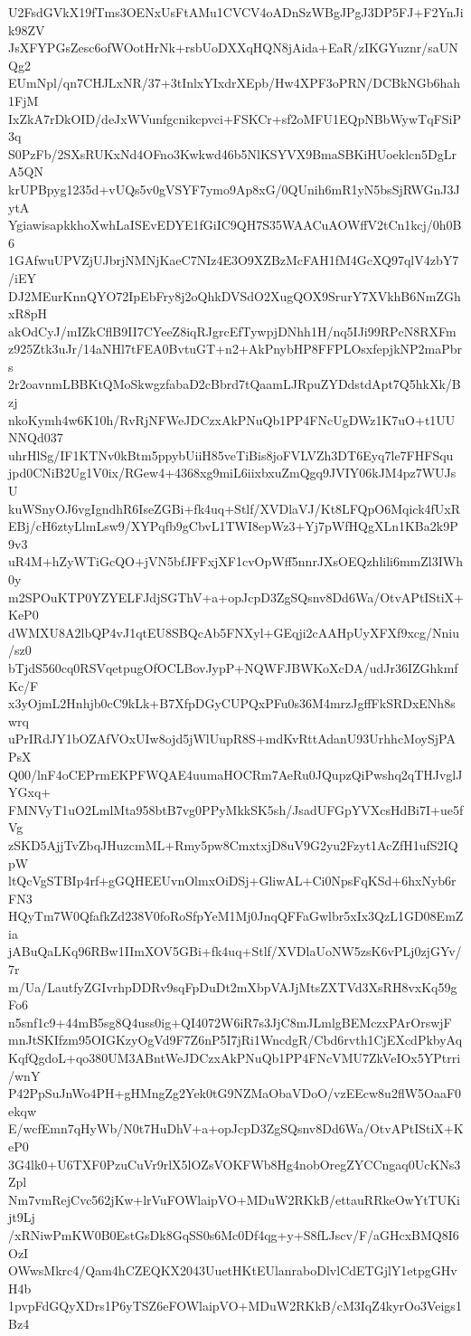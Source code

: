 U2FsdGVkX19fTms3OENxUsFtAMu1CVCV4oADnSzWBgJPgJ3DP5FJ+F2YnJik98ZV
JsXFYPGsZesc6ofWOotHrNk+rsbUoDXXqHQN8jAida+EaR/zIKGYuznr/saUNQg2
EUmNpl/qn7CHJLxNR/37+3tInlxYIxdrXEpb/Hw4XPF3oPRN/DCBkNGb6hah1FjM
IxZkA7rDkOID/deJxWVunfgcnikcpvci+FSKCr+sf2oMFU1EQpNBbWywTqFSiP3q
S0PzFb/2SXsRUKxNd4OFno3Kwkwd46b5NlKSYVX9BmaSBKiHUoeklcn5DgLrA5QN
krUPBpyg1235d+vUQs5v0gVSYF7ymo9Ap8xG/0QUnih6mR1yN5bsSjRWGnJ3JytA
YgiawisapkkhoXwhLaISEvEDYE1fGiIC9QH7S35WAACuAOWffV2tCn1kcj/0h0B6
1GAfwuUPVZjUJbrjNMNjKaeC7NIz4E3O9XZBzMcFAH1fM4GcXQ97qlV4zbY7/iEY
DJ2MEurKnnQYO72IpEbFry8j2oQhkDVSdO2XugQOX9SrurY7XVkhB6NmZGhxR8pH
akOdCyJ/mIZkCflB9II7CYeeZ8iqRJgrcEfTywpjDNhh1H/nq5IJi99RPcN8RXFm
z925Ztk3uJr/14aNHl7tFEA0BvtuGT+n2+AkPnybHP8FFPLOsxfepjkNP2maPbrs
2r2oavnmLBBKtQMoSkwgzfabaD2cBbrd7tQaamLJRpuZYDdstdApt7Q5hkXk/Bzj
nkoKymh4w6K10h/RvRjNFWeJDCzxAkPNuQb1PP4FNcUgDWz1K7uO+t1UUNNQd037
uhrHlSg/IF1KTNv0kBtm5ppybUiiH85veTiBis8joFVLVZh3DT6Eyq7le7FHFSqu
jpd0CNiB2Ug1V0ix/RGew4+4368xg9miL6iixbxuZmQgq9JVIY06kJM4pz7WUJsU
kuWSnyOJ6vgIgndhR6IseZGBi+fk4uq+Stlf/XVDlaVJ/Kt8LFQpO6Mqick4fUxR
EBj/cH6ztyLlmLsw9/XYPqfb9gCbvL1TWI8epWz3+Yj7pWfHQgXLn1KBa2k9P9v3
uR4M+hZyWTiGcQO+jVN5bfJFFxjXF1cvOpWff5nnrJXsOEQzhlili6mmZl3IWh0y
m2SPOuKTP0YZYELFJdjSGThV+a+opJcpD3ZgSQsnv8Dd6Wa/OtvAPtIStiX+KeP0
dWMXU8A2lbQP4vJ1qtEU8SBQcAb5FNXyl+GEqji2cAAHpUyXFXf9xcg/Nniu/sz0
bTjdS560cq0RSVqetpugOfOCLBovJypP+NQWFJBWKoXcDA/udJr36IZGhkmfKc/F
x3yOjmL2Hnhjb0cC9kLk+B7XfpDGyCUPQxPFu0s36M4mrzJgffFkSRDxENh8swrq
uPrIRdJY1bOZAfVOxUIw8ojd5jWlUupR8S+mdKvRttAdanU93UrhhcMoySjPAPsX
Q00/lnF4oCEPrmEKPFWQAE4uumaHOCRm7AeRu0JQupzQiPwshq2qTHJvglJYGxq+
FMNVyT1uO2LmlMta958btB7vg0PPyMkkSK5sh/JsadUFGpYVXcsHdBi7I+ue5fVg
zSKD5AjjTvZbqJHuzcmML+Rmy5pw8CmxtxjD8uV9G2yu2Fzyt1AcZfH1ufS2IQpW
ltQcVgSTBIp4rf+gGQHEEUvnOlmxOiDSj+GliwAL+Ci0NpsFqKSd+6hxNyb6rFN3
HQyTm7W0QfafkZd238V0foRoSfpYeM1Mj0JnqQFFaGwlbr5xIx3QzL1GD08EmZia
jABuQaLKq96RBw1IImXOV5GBi+fk4uq+Stlf/XVDlaUoNW5zsK6vPLj0zjGYv/7r
m/Ua/LautfyZGIvrhpDDRv9sqFpDuDt2mXbpVAJjMtsZXTVd3XsRH8vxKq59gFo6
n5snf1c9+44mB5sg8Q4uss0ig+QI4072W6iR7s3JjC8mJLmlgBEMczxPArOrswjF
mnJtSKIfzm95OIGKzyOgVd9F7Z6nP5I7jRi1WncdgR/Cbd6rvth1CjEXcdPkbyAq
KqfQgdoL+qo380UM3ABntWeJDCzxAkPNuQb1PP4FNcVMU7ZkVeIOx5YPtrri/wnY
P42PpSuJnWo4PH+gHMngZg2Yek0tG9NZMaObaVDoO/vzEEcw8u2flW5OaaF0ekqw
E/wcfEmn7qHyWb/N0t7HuDhV+a+opJcpD3ZgSQsnv8Dd6Wa/OtvAPtIStiX+KeP0
3G4lk0+U6TXF0PzuCuVr9rlX5lOZsVOKFWb8Hg4nobOregZYCCngaq0UcKNs3Zpl
Nm7vmRejCvc562jKw+lrVuFOWlaipVO+MDuW2RKkB/ettauRRkeOwYtTUKijt9Lj
/xRNiwPmKW0B0EstGsDk8GqSS0s6Mc0Df4qg+y+S8fLJscv/F/aGHcxBMQ8I6OzI
OWwsMkrc4/Qam4hCZEQKX2043UuetHKtEUlanraboDlvlCdETGjlY1etpgGHvH4b
1pvpFdGQyXDrs1P6yTSZ6eFOWlaipVO+MDuW2RKkB/cM3IqZ4kyrOo3Veigs1Bz4
